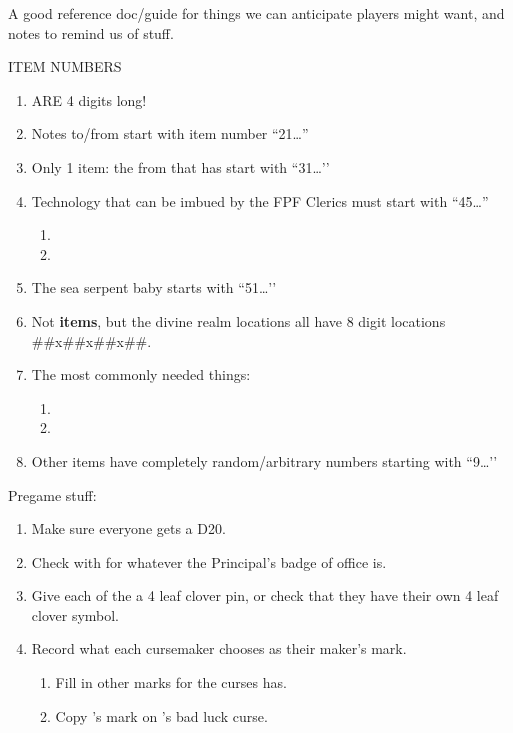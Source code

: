\documentclass[green]{GL2020}
\begin{document}
\name{\gGMGuide{}}

A good reference doc/guide for things we can anticipate players might want, and notes to remind us of stuff.

{\large ITEM NUMBERS}
\begin{enumerate}
	\item ARE 4 digits long!
	\item Notes to/from \cChupInventor{} start with item number ``21\ldots ''
	\item Only 1 item: the \iFolderOfNotes{} from \cBunker{} that \cDisney{} has start with ``31\ldots ’’
	\item Technology that can be imbued by the FPF Clerics must start with ``45\ldots ''
	\begin{enumerate}
		\item \iMagicMusicBox{}
		\item \iVidCom{}
	\end{enumerate}
	\item The sea serpent baby starts with ``51…’’
	\item Not \textbf{items}, but the divine realm locations all have 8 digit locations ##x##x##x##.
	\item The most commonly needed things:
	\begin{enumerate}
		\item \iRitualCandle{}
		\item \iGlassVial{}
	\end{enumerate}
	\item Other items have completely random/arbitrary numbers starting with ``9\ldots ’’
\end{enumerate}

{\large Pregame stuff:}
\begin{enumerate}
	\item Make sure everyone gets a D20.
	\item Check with \cPrincipal{\MYplayer} for whatever the Principal's badge of office is.
	\item Give each of the \pGoaties{} a 4 leaf clover pin, or check that they have their own 4 leaf clover symbol.
	\item Record what each cursemaker chooses as their maker’s mark.
	\begin{enumerate}
		\item Fill in other marks for the curses \cHedonist{\MYplayer} has.
		\item Copy \cPrince{}’s mark on \cInitiate{}’s bad luck curse.
	\end{enumerate}
\end{enumerate}
\end{document}
